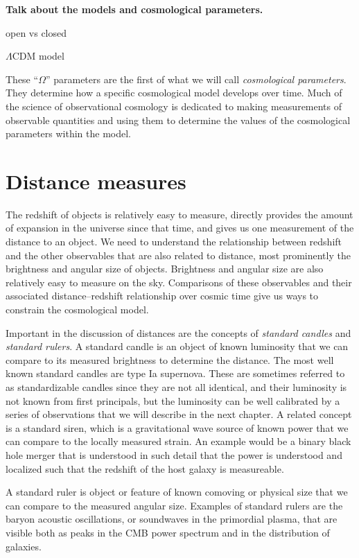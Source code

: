 \textbf{Talk about the models and cosmological parameters.}

open vs closed

$\Lambda$CDM model


These ``$\Omega$'' parameters are the first of what we will call \textit{cosmological parameters}.  They determine how a specific cosmological model develops over time.  Much of the science of observational cosmology is dedicated to making measurements of observable quantities and using them to determine the values of the cosmological parameters within the model.

\section{Distance measures}

The redshift of objects is relatively easy to measure, directly provides the amount of expansion in the universe since that time, and gives us one measurement of the distance to an object.  We need to understand the relationship between redshift and the other observables that are also related to distance, most prominently the brightness and angular size of objects.  Brightness and angular size are also relatively easy to measure on the sky.  Comparisons of these observables and their associated distance--redshift relationship over cosmic time give us ways to constrain the cosmological model.

Important in the discussion of distances are the concepts of \textit{standard candles} and \textit{standard rulers}.  A standard candle is an object of known luminosity that we can compare to its measured brightness to determine the distance.  The most well known standard candles are type Ia supernova.  These are sometimes referred to as standardizable candles since they are not all identical, and their luminosity is not known from first principals, but the luminosity can be well calibrated by a series of observations that we will describe in the next chapter.  A related concept is a standard siren, which is a gravitational wave source of known power that we can compare to the locally measured strain.  An example would be a binary black hole merger that is understood in such detail that the power is understood and localized such that the redshift of the host galaxy is measureable.

A standard ruler is object or feature of known comoving or physical size that we can compare to the measured angular size.  Examples of standard rulers are the baryon acoustic oscillations, or soundwaves in the primordial plasma, that are visible both as peaks in the CMB power spectrum and in the distribution of galaxies.  

